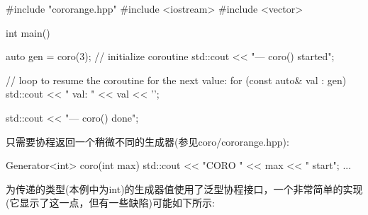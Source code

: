 
\begin{cpp}
#include "cororange.hpp"
#include <iostream>
#include <vector>

int main()
{
	auto gen = coro(3); // initialize coroutine
	std::cout << "--- coro() started\n";

	// loop to resume the coroutine for the next value:
	for (const auto& val : gen) {
		std::cout << " val: " << val << '\n';
	}

	std::cout << "--- coro() done\n";
}
\end{cpp}

只需要协程返回一个稍微不同的生成器(参见coro/cororange.hpp):

\begin{cpp}
Generator<int> coro(int max)
{
	std::cout << "CORO " << max << " start\n";
	...
}
\end{cpp}

为传递的类型(本例中为int)的生成器值使用了泛型协程接口，一个非常简单的实现(它显示了这一点，但有一些缺陷)可能如下所示:


